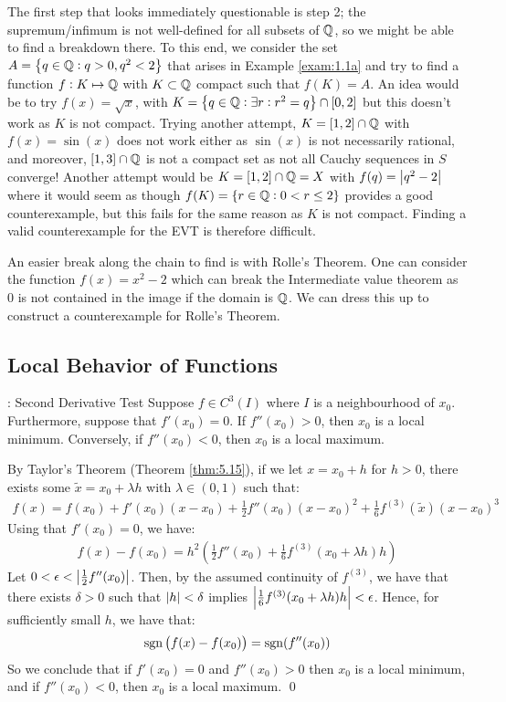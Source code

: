 The first step that looks immediately questionable is step 2; the supremum/infimum is not well-defined for all subsets of $\mathbb{Q}$, so we might be able to find a breakdown there. To this end, we consider the set $A = \set{q \in \mathbb{Q}: q > 0, q^2 < 2}$ that arises in Example \ref{exam:1.1a} and try to find a function $f: K \mapsto \mathbb{Q}$ with $K \subset \mathbb{Q}$ compact such that $f(K) = A$. An idea would be to try $f(x) = \sqrt{x}$, with $K = \set{q \in \mathbb{Q}: \exists r: r^2 = q} \cap [0, 2]$ but this doesn't work as $K$ is not compact. Trying another attempt, $K = [1, 2] \cap \mathbb{Q}$ with $f(x) = \sin(x)$ does not work either as $\sin(x)$ is not necessarily rational, and moreover, $[1, 3] \cap \mathbb{Q}$ is not a compact set as not all Cauchy sequences in $S$ converge! Another attempt would be $K = [1, 2] \cap \mathbb{Q} = X$ with $f(q) = \abs{q^2 - 2}$ where it would seem as though $f(K) = \set{r \in \mathbb{Q}: 0 < r \leq 2}$ provides a good counterexample, but this fails for the same reason as $K$ is not compact. Finding a valid counterexample for the EVT is therefore difficult. 

An easier break along the chain to find is with Rolle's Theorem. One can consider the function $f(x) = x^2 - 2$ which can break the Intermediate value theorem as $0$ is not contained in the image if the domain is $\mathbb{Q}$. We can dress this up to construct a counterexample for Rolle's Theorem.

\subsection{Local Behavior of Functions}
\begin{ntheorem}{: Second Derivative Test}{}
    Suppose $f \in C^{3}(I)$ where $I$ is a neighbourhood of $x_0$. Furthermore, suppose that $f'(x_0) = 0$. If $f''(x_0) > 0$, then $x_0$ is a local minimum. Conversely, if $f''(x_0) < 0$, then $x_0$ is a local maximum.
\end{ntheorem}
\begin{nproof}
    By Taylor's Theorem (Theorem \ref{thm:5.15}), if we let $x = x_0 + h$ for $h > 0$, there exists some $\tilde{x} = x_0 + \lambda h$ with $\lambda \in (0, 1)$ such that:
    \begin{align*}
        f(x) = f(x_0) + f'(x_0)(x - x_0) + \frac{1}{2}f''(x_0)(x - x_0)^2 + \frac{1}{6}f^{(3)}(\tilde{x})(x - x_0)^3
    \end{align*}
    Using that $f'(x_0) = 0$, we have:
    \begin{align*}
        f(x) - f(x_0) = h^2\left(\frac{1}{2}f''(x_0) + \frac{1}{6}f^{(3)}(x_0 + \lambda h) h\right)
    \end{align*} 
    Let $0 < \epsilon < \abs{\frac{1}{2}f''(x_0)}$. Then, by the assumed continuity of $f^(3)$, we have that there exists $\delta > 0$ such that $\abs{h} < \delta$ implies $\abs{\frac{1}{6}f^{(3)}(x_0 + \lambda h)h} < \epsilon$. Hence, for sufficiently small $h$, we have that:
    \begin{align*}
        \operatorname{sgn}\left(f(x) - f(x_0)\right) = \operatorname{sgn}(f''(x_0))
    \end{align*}
    So we conclude that if $f'(x_0) = 0$ and $f''(x_0) > 0$ then $x_0$ is a local minimum, and if $f''(x_0) < 0$, then $x_0$ is a local maximum. \qed
\end{nproof}

